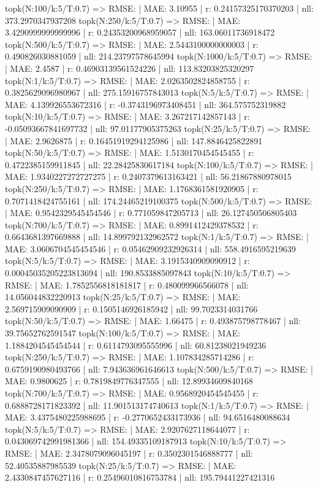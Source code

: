topk(N:100/k:5/T:0.7) => RMSE: | MAE: 3.10955 | r: 0.24157325170370203 | nll: 373.2970347937208
topk(N:250/k:5/T:0.7) => RMSE: | MAE: 3.4290999999999996 | r: 0.24353200968959057 | nll: 163.06011736918472
topk(N:500/k:5/T:0.7) => RMSE: | MAE: 2.5443100000000003 | r: 0.490826030881059 | nll: 214.23797578645994
topk(N:1000/k:5/T:0.7) => RMSE: | MAE: 2.4587 | r: 0.46903139561524226 | nll: 113.83203825320297
topk(N:1/k:5/T:0.7) => RMSE: | MAE: 2.0263502824858755 | r: 0.3825629096980967 | nll: 275.15916757843013
topk(N:5/k:5/T:0.7) => RMSE: | MAE: 4.139926553672316 | r: -0.3743196973408451 | nll: 364.575752319882
topk(N:10/k:5/T:0.7) => RMSE: | MAE: 3.267217142857143 | r: -0.05093667841697732 | nll: 97.01177905375263
topk(N:25/k:5/T:0.7) => RMSE: | MAE: 2.9626875 | r: 0.16451919294125986 | nll: 147.8846425822891
topk(N:50/k:5/T:0.7) => RMSE: | MAE: 1.5130170454545455 | r: 0.4722385159911845 | nll: 22.28425830617184
topk(N:100/k:5/T:0.7) => RMSE: | MAE: 1.9340227272727275 | r: 0.2407379613163421 | nll: 56.21867880978015
topk(N:250/k:5/T:0.7) => RMSE: | MAE: 1.1768361581920905 | r: 0.7071418424755161 | nll: 174.24465219100375
topk(N:500/k:5/T:0.7) => RMSE: | MAE: 0.9542329545454546 | r: 0.771059847205713 | nll: 26.127450506805403
topk(N:700/k:5/T:0.7) => RMSE: | MAE: 0.8991412429378532 | r: 0.6643681397669888 | nll: 14.899792132962572
topk(N:1/k:5/T:0.7) => RMSE: | MAE: 3.0606704545454546 | r: 0.05462909232926314 | nll: 558.4916595219639
topk(N:5/k:5/T:0.7) => RMSE: | MAE: 3.1915340909090912 | r: 0.00045035205223813694 | nll: 190.8533885097843
topk(N:10/k:5/T:0.7) => RMSE: | MAE: 1.7852556818181817 | r: 0.480099966566078 | nll: 14.056044832220913
topk(N:25/k:5/T:0.7) => RMSE: | MAE: 2.569715909090909 | r: 0.1505146926185942 | nll: 99.7023314031766
topk(N:50/k:5/T:0.7) => RMSE: | MAE: 1.66475 | r: 0.493875798778467 | nll: 39.75652762591547
topk(N:100/k:5/T:0.7) => RMSE: | MAE: 1.1884204545454544 | r: 0.6114793095555996 | nll: 60.81238021949236
topk(N:250/k:5/T:0.7) => RMSE: | MAE: 1.107834285714286 | r: 0.6759190980493766 | nll: 7.943636961646613
topk(N:500/k:5/T:0.7) => RMSE: | MAE: 0.9800625 | r: 0.7819849776347555 | nll: 12.89934609840168
topk(N:700/k:5/T:0.7) => RMSE: | MAE: 0.9568920454545455 | r: 0.6888728171823392 | nll: 11.901513174740613
topk(N:1/k:5/T:0.7) => RMSE: | MAE: 3.4375480225988695 | r: -0.2770652433173936 | nll: 94.6516480088634
topk(N:5/k:5/T:0.7) => RMSE: | MAE: 2.9207627118644077 | r: 0.043069742991981366 | nll: 154.49335109187913
topk(N:10/k:5/T:0.7) => RMSE: | MAE: 2.3478079096045197 | r: 0.3502301546888777 | nll: 52.40535887985539
topk(N:25/k:5/T:0.7) => RMSE: | MAE: 2.4330847457627116 | r: 0.25496010816753784 | nll: 195.79441227421316
